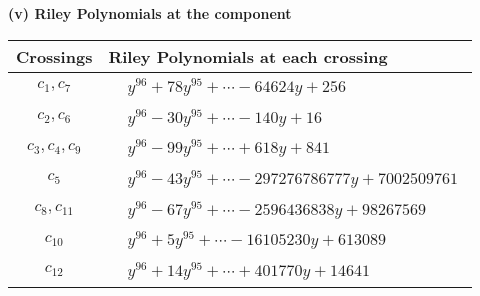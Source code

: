 \documentclass[1p]{elsarticle_modified}
\theoremstyle{definition}
\begin{document}
\flushleft \textbf{(v) Riley Polynomials at the component}\newline \\
\begin{tabular}{m{50pt}|m{274pt}}
Crossings & \hspace{64pt}Riley Polynomials at each crossing \\
\hline $$\begin{aligned}c_{1},c_{7}\end{aligned}$$&$\begin{aligned}
&y^{96}+78 y^{95}+\cdots-64624 y+256
\end{aligned}$\\
\hline $$\begin{aligned}c_{2},c_{6}\end{aligned}$$&$\begin{aligned}
&y^{96}-30 y^{95}+\cdots-140 y+16
\end{aligned}$\\
\hline $$\begin{aligned}c_{3},c_{4},c_{9}\end{aligned}$$&$\begin{aligned}
&y^{96}-99 y^{95}+\cdots+618 y+841
\end{aligned}$\\
\hline $$\begin{aligned}c_{5}\end{aligned}$$&$\begin{aligned}
&y^{96}-43 y^{95}+\cdots-297276786777 y+7002509761
\end{aligned}$\\
\hline $$\begin{aligned}c_{8},c_{11}\end{aligned}$$&$\begin{aligned}
&y^{96}-67 y^{95}+\cdots-2596436838 y+98267569
\end{aligned}$\\
\hline $$\begin{aligned}c_{10}\end{aligned}$$&$\begin{aligned}
&y^{96}+5 y^{95}+\cdots-16105230 y+613089
\end{aligned}$\\
\hline $$\begin{aligned}c_{12}\end{aligned}$$&$\begin{aligned}
&y^{96}+14 y^{95}+\cdots+401770 y+14641
\end{aligned}$\\
\hline
\end{tabular}\\~\\
\end{document}
